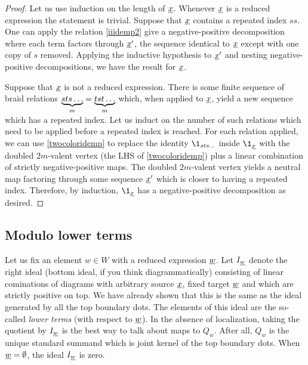 \begin{proof} Let us use induction on the length of ${\underline{x}}$. Whenever ${\underline{x}}$ is a reduced expression the statement is trivial. Suppose that ${\underline{x}}$ contains a repeated index $ss$. One can apply
the relation \eqref{iiidemp2} give a negative-positive decomposition where each term factors through ${\underline{x}}'$, the sequence identical to ${\underline{x}}$ except with one copy of $s$ removed. Applying
the inductive hypothesis to ${\underline{x}}'$ and nesting negative-positive decompositions, we have the result for ${\underline{x}}$.

Suppose that ${\underline{x}}$ is not a reduced expression. There is some finite sequence of braid relations $\underbrace{sts\ldots}_{m} = \underbrace{tst\ldots}_{m}$ which, when applied to ${\underline{x}}$, yield a new
sequence which has a repeated index. Let us induct on the number of such relations which need to be applied before a repeated index is reached. For each relation applied, we can use
\eqref{twocoloridemp} to replace the identity $\1_{sts\ldots}$ inside $\1_{\un{x}}$ with the doubled $2m$-valent vertex (the LHS of \eqref{twocoloridemp}) plus a linear combination of strictly
negative-positive maps. The doubled $2m$-valent vertex yields a neutral map factoring through some sequence ${\underline{x}}'$ which is closer to having a repeated index. Therefore, by induction,
$\1_{\un{x}}$ has a negative-positive decomposition as desired. \end{proof}

\subsection{Modulo lower terms}
\label{subsec-modulolower}

Let us fix an element $w \in W$ with a reduced expression ${\underline{w}}$. Let $I_{\underline{w}}$ denote the right ideal (bottom ideal, if you think diagrammatically) consisting of linear cominations of diagrams with arbitrary source $\underline{x}$, fixed target $\underline{w}$ and which are strictly positive on top. We have already shown that this is the same as the ideal generated by all the top boundary dots. The elements of this ideal are the so-called \emph{lower terms} (with respect to $\underline{w}$).
In the absence of localization, taking the quotient by $I_{\underline{w}}$ is the best way to talk about maps to $Q_w$. After all, $Q_w$ is the unique standard summand which is joint kernel of the top
boundary dots. When ${\underline{w}} = \emptyset$, the ideal $I_{\underline{w}}$ is zero.


